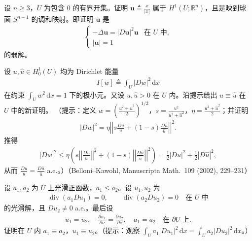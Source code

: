 \documentclass[../../main.tex]{subfiles}
\begin{document}
\begin{exercise}\label{exercise:ch08-7-16}
设 $n\geqslant 3$，$U$ 为包含 $0$ 的有界开集。证明 $\mathbf{u}\triangleq\frac{x}{|x|}$ 属于 $H^1(U;\mathbb{R}^n)$，且是映到球面 $S^{n-1}$ 的调和映射。即证明 $\mathbf{u}$ 是
\begin{align*}
\begin{cases}
-\Delta\mathbf{u}=|D\mathbf{u}|^2\mathbf{u}&\text{在 }U\text{ 中},\\
|\mathbf{u}|=1
\end{cases}
\end{align*}
的弱解。
\end{exercise}

\begin{exercise}\label{exercise:ch08-7-17}
设 $u,\widehat{u}\in H_0^1(U)$ 均为 Dirichlet 能量
\begin{align*}
I[w]\triangleq\int_U|Dw|^2\,\mathrm{d}x
\end{align*}
在约束 $\int_U w^2\,\mathrm{d}x=1$ 下的极小元。又设 $u,\widehat{u}>0$ 在 $U$ 内。沿提示给出 $u\equiv\widehat{u}$ 在 $U$ 中的新证明。
（提示：定义 $w=\left(\frac{u^2+\widehat{u}^2}{2}\right)^{1/2}$，$s=\frac{u^2}{u^2+\widehat{u}^2}$，$\eta=\frac{u^2+\widehat{u}^2}{2}$；并证明
\begin{align*}
|Dw|^2=\eta\left|\left|s\frac{Du}{u}+(1-s)\frac{D\widehat{u}}{\widehat{u}}\right|\right|^2.
\end{align*}
推得
\begin{align*}
|Dw|^2\leqslant\eta\left(s\left|\left|\frac{Du}{u}\right|\right|^2+(1-s)\left|\left|\frac{D\widehat{u}}{\widehat{u}}\right|\right|^2\right)=\frac12|Du|^2+\frac12|D\widehat{u}|^2,
\end{align*}
从而 $\frac{Du}{u}=\frac{D\widehat{u}}{\widehat{u}}$ a.e.。）（Belloni--Kawohl, Manuscripta Math.\ 109 (2002), 229--231）
\end{exercise}

\begin{exercise}\label{exercise:ch08-7-18}
设 $a_1,a_2$ 为 $\overline{U}$ 上光滑正函数，$a_1\leqslant a_2$。设 $u_1,u_2$ 为
\begin{align*}
\operatorname{div}(a_1Du_1)=0,\qquad \operatorname{div}(a_2Du_2)=0\quad\text{在 }U\text{ 中}
\end{align*}
的光滑解，且 $Du_2\neq 0$ a.e.。最后设
\begin{align*}
u_1=u_2,\quad \frac{\partial u_1}{\partial\nu}=\frac{\partial u_2}{\partial\nu},\quad a_1=a_2\quad\text{在 }\partial U\text{ 上}.
\end{align*}
证明在 $U$ 内 $a_1\equiv a_2$，$u_1\equiv u_2$。（提示：观察 $\int_U a_1|Du_1|^2\,\mathrm{d}x=\int_U a_2|Du_2|^2\,\mathrm{d}x$。）
\end{exercise}
\end{document}
